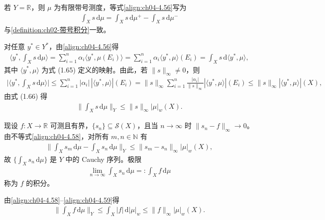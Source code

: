 \documentclass[../../main.tex]{subfiles}%
\begin{document}
\begin{remark}\label{remark:ch04-向量测度积分标量}
若 $Y=\mathbb{R}$，则 $\mu$ 为有限带号测度，等式\eqref{align:ch04-4.56}写为
\begin{align}
\int_X s\,\mathrm{d}\mu=\int_X s\,\mathrm{d}\mu^+-\int_X s\,\mathrm{d}\mu^- \label{align:ch04-4.57}
\end{align}
与\cref{definition:ch02-带号积分}一致。
\end{remark}

对任意 $y^*\in Y^*$，由\eqref{align:ch04-4.56}得
\begin{align*}
\Big\langle y^*,\int_X s\,\mathrm{d}\mu\Big\rangle=\sum_{i=1}^n\alpha_i\langle y^*,\mu(E_i)\rangle=\sum_{i=1}^n\alpha_i\langle y^*,\mu\rangle(E_i)=\int_X s\,\mathrm{d}\langle y^*,\mu\rangle,
\end{align*}
其中 $\langle y^*,\mu\rangle$ 为式 (1.65) 定义的映射。由此，若 $\|s\|_\infty\neq0$，则
\begin{align*}
\Big|\Big\langle y^*,\int_X s\,\mathrm{d}\mu\Big\rangle\Big|
\leqslant\sum_{i=1}^n|\alpha_i|\,|\langle y^*,\mu\rangle|(E_i)
=\|s\|_\infty\sum_{i=1}^n\frac{|\alpha_i|}{\|s\|_\infty}|\langle y^*,\mu\rangle|(E_i)
\leqslant\|s\|_\infty|\langle y^*,\mu\rangle|(X),
\end{align*}
由式 (1.66) 得
\begin{align}
\Big\|\int_X s\,\mathrm{d}\mu\Big\|_Y\leqslant\|s\|_\infty|\mu|_w(X). \label{align:ch04-4.58}
\end{align}

现设 $f:X\to\mathbb{R}$ 可测且有界，$\{s_n\}\subseteq\mathcal{S}(X)$，且当 $n\to\infty$ 时 $\|s_n-f\|_\infty\to0$。由不等式\eqref{align:ch04-4.58}，对所有 $m,n\in\mathbb{N}$ 有
\begin{align*}
\Big\|\int_X s_m\,\mathrm{d}\mu-\int_X s_n\,\mathrm{d}\mu\Big\|_Y\leqslant\|s_m-s_n\|_\infty|\mu|_w(X),
\end{align*}
故 $\{\int_X s_n\,\mathrm{d}\mu\}$ 是 $Y$ 中的 Cauchy 序列。极限
\begin{align}
\lim_{n\to\infty}\int_X s_n\,\mathrm{d}\mu=:\int_X f\,\mathrm{d}\mu \label{align:ch04-4.59}
\end{align}
称为 $f$ 的积分。

由\eqref{align:ch04-4.58}--\eqref{align:ch04-4.59}得
\begin{align}
\Big\|\int_X f\,\mathrm{d}\mu\Big\|_Y\leqslant\int_X|f|\,\mathrm{d}|\mu|_w\leqslant\|f\|_\infty|\mu|_w(X). \label{align:ch04-4.60}
\end{align}
\end{document}

